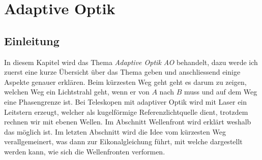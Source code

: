 \chapter{Adaptive Optik\label{chapter:thema}}
\begin{refsection}

\section{Einleitung}
In diesem Kapitel wird das Thema \textit{Adaptive Optik AO} behandelt, dazu werde ich zuerst eine kurze Übersicht über das Thema geben und anschliessend einige Aspekte genauer erklären. Beim kürzesten Weg geht geht es darum zu zeigen, welchen Weg ein Lichtstrahl geht, wenn er von $A$ nach $B$ muss und auf dem Weg eine Phasengrenze ist. Bei Teleskopen mit adaptiver Optik wird mit Laser ein Leitstern erzeugt, welcher als kugelförmige Referenzlichtquelle dient, trotzdem rechnen wir mit ebenen Wellen. Im Abschnitt Wellenfront wird erklärt weshalb das möglich ist. Im letzten Abschnitt wird die Idee vom kürzesten Weg verallgemeinert, was dann zur Eikonalgleichung führt, mit welche dargestellt werden kann, wie sich die Wellenfronten verformen. 


\end{refsection}
